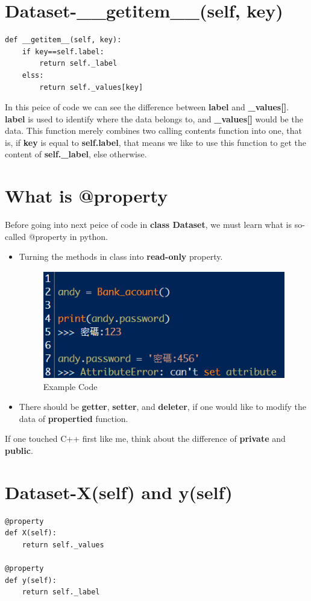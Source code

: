 \documentclass[12pt]{report}
\numberwithin{equation}{section}
\begin{document}
\section{Dataset-\_\_getitem\_\_(self, key)}
\begin{lstlisting}
def __getitem__(self, key):
    if key==self.label:
        return self._label
    elss:
        return self._values[key]
\end{lstlisting}

In this peice of code we can see the difference between \textbf{label} and \textbf{\_values[]}.
 \textbf{label} is used to identify where the data belongs to, and \textbf{\_values[]} would be the data.
This function merely combines two calling contents function into one, that is, if \textbf{key} is equal to \textbf{self.label}, that means we like to use this function to get the content of \textbf{self.\_label}, else otherwise.

\section{What is @property}
Before going into next peice of code in \textbf{class Dataset}, we must learn what is so-called @property in python.
\begin{itemize}
    \item Turning the methods in class into \textbf{read-only} property.
    \begin{figure}[H]
        \centering
        \includegraphics[width=0.7\linewidth]{1st property.png}
        \caption{Example Code}
        \label{2}
    \end{figure}
    \item There should be \textbf{getter}, \textbf{setter}, and \textbf{deleter}, if one would like to modify the data of \textbf{propertied} function.
\end{itemize}

If one touched C++ first like me, think about the difference of \textbf{private} and \textbf{public}.

\section{Dataset-X(self) and y(self)}
\begin{lstlisting}
@property
def X(self):
    return self._values

@property
def y(self):
    return self._label
\end{lstlisting}
\end{document}
